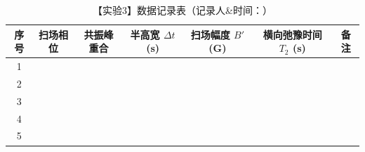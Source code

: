 \begin{table}[h!]
	\centering
	\caption{【实验3】数据记录表（记录人\&时间：\hspace{4cm}）}
	\renewcommand{\arraystretch}{1.5}
	\begin{tabular}{|c|c|c|c|c|c|c|}
		\hline
		\textbf{序号} & \textbf{扫场相位} & \textbf{共振峰重合} & \textbf{半高宽 $\Delta t$ (s)} & \textbf{扫场幅度 $B'$ (G)} & \textbf{横向弛豫时间 $T_2$ (s)} & \textbf{备注} \\ \hline
		1 & \hspace{2cm} & \hspace{2.5cm} & \hspace{2.5cm} & \hspace{2.5cm} & \hspace{2.5cm} & \hspace{1cm} \\ \hline
		2 & \hspace{2cm} & \hspace{2.5cm} & \hspace{2.5cm} & \hspace{2.5cm} & \hspace{2.5cm} & \hspace{1cm} \\ \hline
		3 & \hspace{2cm} & \hspace{2.5cm} & \hspace{2.5cm} & \hspace{2.5cm} & \hspace{2.5cm} & \hspace{1cm} \\ \hline
		4 & \hspace{2cm} & \hspace{2.5cm} & \hspace{2.5cm} & \hspace{2.5cm} & \hspace{2.5cm} & \hspace{1cm} \\ \hline
		5 & \hspace{2cm} & \hspace{2.5cm} & \hspace{2.5cm} & \hspace{2.5cm} & \hspace{2.5cm} & \hspace{1cm} \\ \hline
	\end{tabular}
\end{table}

